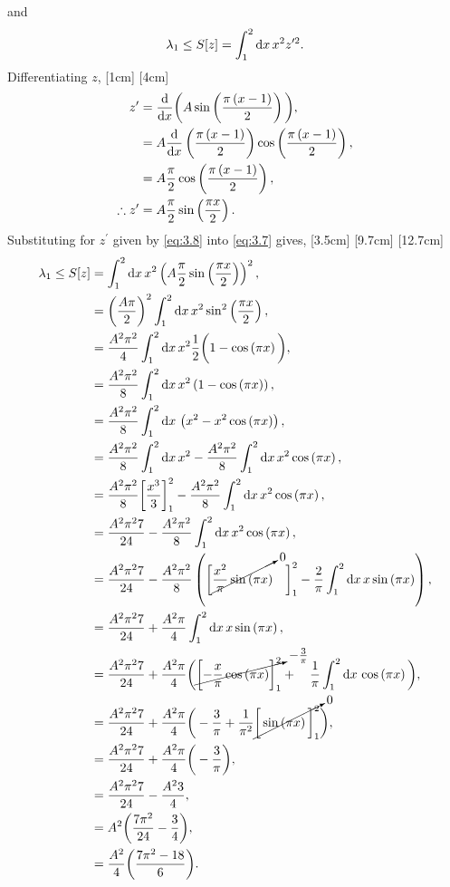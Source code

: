 and
\begin{align}
\label{eq:3.7}
\lambda_1 \leq S[z] = \int_{1}^{2}\mathrm{d} x\, x^2 z^{\prime 2}.
\end{align}
Differentiating $z$,
[1cm]
[4cm]
\begin{align}
	z^\prime &= \frac{\mathrm{d}}{\mathrm{d}x}\bigg(A\sin\left(\frac{\pi\left(x-1\right)}{2}\right)\bigg),\nonumber\\
	&= A\frac{\mathrm{d}}{\mathrm{d}x}\left(\frac{\pi\left(x-1\right)}{2}\right)\cos\left(\frac{\pi\left(x-1\right)}{2}\right),\nonumber\\
	&= A\frac{\pi}{2}\cos\left(\frac{\pi\left(x-1\right)}{2}\right),\nonumber\\
	\label{eq:3.8}
	\therefore z^\prime&= A\frac{\pi}{2}\sin\left(\frac{\pi x}{2}\right).
\end{align}
Substituting for $z^\prime$ given by \eqref{eq:3.8} into \eqref{eq:3.7} gives,
[3.5cm]
[9.7cm]
[12.7cm]
\begin{align}
	\lambda_1 \leq S[z] &= \int_{1}^{2}\mathrm{d} x\, x^2 \left(A\frac{\pi}{2}\sin\left(\frac{\pi x}{2}\right)\right)^2,\nonumber\\
	&=\left(\frac{A\pi}{2}\right)^2\int_{1}^{2}\mathrm{d} x\, x^2 \sin^2\left(\frac{\pi x}{2}\right),\nonumber\\
	&=\frac{A^2\pi^2}{4}\int_{1}^{2}\mathrm{d} x\, x^2 \frac{1}{2}\bigg(1-\cos\left(\pi x\right)\bigg),\nonumber\\
	&= \frac{A^2\pi^2}{8}\int_{1}^{2}\mathrm{d} x\, x^2 \left(1-\cos\left(\pi x\right)\right),\nonumber\\
	&= \frac{A^2\pi^2}{8}\int_{1}^{2}\mathrm{d} x\, \left(x^2 - x^2\cos\left(\pi x\right)\right),\nonumber\\
	&= \frac{A^2\pi^2}{8}\int_{1}^{2}\mathrm{d} x\, x^2 - \frac{A^2\pi^2}{8}\int_{1}^{2}\mathrm{d} x\, x^2\cos\left(\pi x\right),\nonumber\\
	&= \frac{A^2\pi^2}{8}\bigg[\frac{x^3}{3}\bigg]_1^2 - \frac{A^2\pi^2}{8}\int_{1}^{2}\mathrm{d} x\, x^2\cos\left(\pi x\right),\nonumber\\
	&= \frac{A^2\pi^2 7}{24} - \frac{A^2\pi^2}{8}\int_{1}^{2}\mathrm{d} x\, x^2\cos\left(\pi x\right),\nonumber\\
	&= \frac{A^2\pi^2 7}{24} - \frac{A^2\pi^2}{8}\left(\bigg[\cancelto{0}{\frac{x^2}{\pi}\sin\left(\pi x\right)}\quad\bigg]_1^2 - \frac{2}{\pi}\int_{1}^{2}\mathrm{d} x\, x\sin\left(\pi x\right)\right),\nonumber\\
	&= \frac{A^2\pi^2 7}{24} + \frac{A^2\pi}{4}\int_{1}^{2}\mathrm{d} x\, x\sin\left(\pi x\right),\nonumber\\
	&= \frac{A^2\pi^2 7}{24} + \frac{A^2\pi}{4}\bigg(\cancelto{-\frac{3}{\pi}}{\bigg[{-\frac{x}{\pi}\cos\left(\pi x\right)}\bigg]_1^2} +\quad\frac{1}{\pi}\int_{1}^{2}\mathrm{d} x\,\cos\left(\pi x\right)\bigg),\nonumber\\
	&= \frac{A^2\pi^2 7}{24} + \frac{A^2\pi}{4}\bigg(-\frac{3}{\pi} + \frac{1}{\pi^2}\cancelto{0}{\bigg[\sin\left(\pi x\right)\bigg]_1^2}\bigg),\nonumber\\
	&= \frac{A^2\pi^2 7}{24} + \frac{A^2\pi}{4}\bigg(-\frac{3}{\pi}\bigg),\nonumber\\
	&= \frac{A^2\pi^2 7}{24} - \frac{A^2 3}{4},\nonumber\\
	&= A^2\bigg(\frac{ 7\pi^2}{24} - \frac{3}{4}\bigg),\nonumber\\
	\label{eq:3.9}
	&= \frac{A^2}{4}\bigg(\frac{ 7\pi^2 -18}{6}\bigg).
\end{align}
